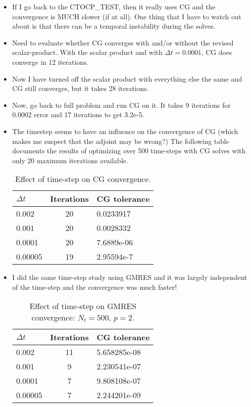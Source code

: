 \documentclass[12pt]{article}
\begin{document}
\begin{itemize}
\item If I go back to the CTOCP\_TEST, then it really uses CG and the
convergence is MUCH slower (if at all).  One thing that I have to watch out
about is that there can be a temporal instability during the solves.

\item Need to evaluate whether CG converges with and/or without the revised
scalar-product.  With the scalar product and with $\Delta t = 0.0001$, CG does
converge in 12 iterations.  

\item Now I have turned off the scalar product with everything else the same
and CG still converges, but it takes 28 iterations.

\item Now, go back to full problem and run CG on it.  It takes 9 iterations
for 0.0002 error and 17 iterations to get 3.2e-5.

\item The timestep seems to have an influence on the convergence of CG (which
makes me suspect that the adjoint may be wrong?)  The following table
documents the results of optimizing over 500 time-steps with CG solves with
only 20 maximum iterations available.

\begin{table}[ht]
\centering
\begin{tabular}{lcl}
\hline
$\Delta t$ & Iterations & CG tolerance \\
\hline
0.002   & 20 & 0.0233917  \\
0.001   & 20 & 0.0028332  \\
0.0001  & 20 & 7.6889e-06 \\
0.00005 & 19 & 2.95594e-7 \\
\hline
\end{tabular}
\caption{Effect of time-step on CG convergence.}
\end{table}

\item I did the same time-step study using GMRES and it was largely
independent of the time-step and the convergence was {\sc much} faster!

\begin{table}[ht]
\centering
\begin{tabular}{lcl}
\hline
$\Delta t$ & Iterations & CG tolerance \\
\hline
0.002   & 11 & 5.658285e-08 \\
0.001   & 9  & 2.230541e-07 \\
0.0001  & 7  & 9.808108e-07 \\
0.00005 & 7  & 2.244201e-09 \\
\hline
\end{tabular}
\caption{Effect of time-step on GMRES convergence: $N_t=500$, $p=2$.}
\end{table}


\end{itemize}
\end{document}
